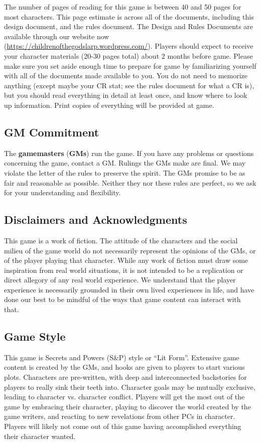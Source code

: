 \documentclass[sheet]{GL2020}
\begin{document}
The number of pages of reading for this game is between 40 and 50 pages for most characters. This page estimate is across all of the documents, including this design document, and the rules document. The Design and Rules Documents are available through our website now (\url{https://childrenofthegodslarp.wordpress.com/}). Players should expect to receive your character materials (20-30 pages total) about 2 months before game. Please make sure you set aside enough time to prepare for game by familiarizing yourself with all of the documents made available to you. You do not need to memorize anything (except maybe your CR stat; see the rules document for what a CR is), but you should read everything in detail at least once, and know where to look up information. Print copies of everything will be provided at game.

\subsection{GM Commitment}
The \textbf{gamemasters} (\textbf{GMs}) run the game. If you have any problems or questions concerning the game, contact a GM. Rulings the GMs make are final.  We may violate the letter of the rules to preserve the spirit.  The GMs promise to be as fair and reasonable as possible. Neither they nor these rules are perfect, so we ask for your understanding and flexibility.

\subsection{Disclaimers and Acknowledgments}
This game is a work of fiction. The attitude of the characters and the social milieu of the game world do not necessarily represent the opinions of the GMs, or of the player playing that character. While any work of fiction must draw some inspiration from real world situations, it is not intended to be a replication or direct allegory of any real world experience. We understand that the player experience is necessarily grounded in their own lived experiences in life, and have done our best to be mindful of the ways that game content can interact with that. 

\subsection{Game Style}
This game is Secrets and Powers (S\&P) style or ``Lit Form''. Extensive game content is created by the GMs, and hooks are given to players to start various plots. Characters are pre-written, with deep and interconnected backstories for players to really sink their teeth into. Character goals may be mutually exclusive, leading to character vs. character conflict. Players will get the most out of the game by embracing their character, playing to discover the world created by the game writers, and reacting to new revelations from other PCs in character. Players will likely not come out of this game having accomplished everything their character wanted.
\end{document}
